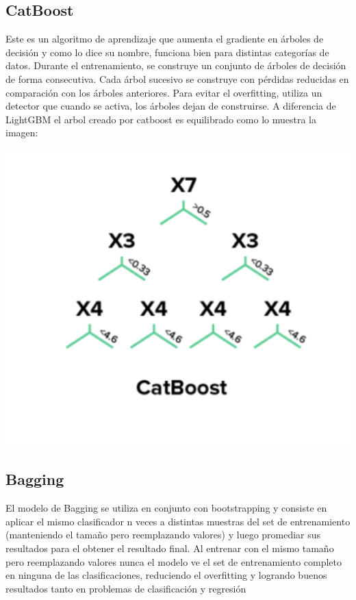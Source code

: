 \documentclass[12pt,a4paper]{article}
\begin{document}
\subsection{CatBoost}
Este es un algoritmo de aprendizaje que aumenta el gradiente en árboles de decisión y como lo dice su nombre, funciona bien para distintas categorías de datos.
Durante el entrenamiento, se construye un conjunto de árboles de decisión de forma consecutiva. Cada árbol sucesivo se construye con pérdidas reducidas en comparación con los árboles anteriores.
Para evitar el overfitting, utiliza un detector que cuando se activa, los árboles dejan de construirse.
A diferencia de LightGBM el arbol creado por catboost es equilibrado como lo muestra la imagen:

\begin{center}
    \includegraphics[scale=0.5]{imgs/catboost.png}
\end{center}

\subsection{Bagging}

El modelo de Bagging se utiliza en conjunto con bootstrapping y consiste en aplicar el mismo clasificador n veces a distintas muestras del set de entrenamiento (manteniendo el tamaño pero reemplazando valores) y luego promediar sus resultados para el obtener el resultado final. 
Al entrenar con el mismo tamaño pero reemplazando valores nunca el modelo ve el set de entrenamiento completo en ninguna de las clasificaciones, reduciendo el overfitting y logrando buenos resultados tanto en problemas de clasificación y regresión
\end{document}
